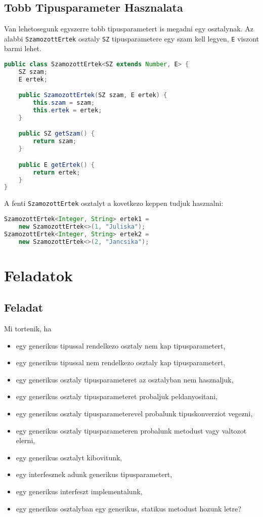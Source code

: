 \documentclass{article}
\let\l\lstinline
\begin{document}
\subsection{Tobb Tipusparameter Hasznalata}

Van lehetosegunk egyszerre tobb tipusparametert is megadni egy osztalynak. Az alabbi \l{SzamozottErtek} osztaly \l{SZ} tipusparametere egy szam kell legyen, \l{E} viszont barmi lehet.

\begin{lstlisting}[language=Java, caption=Osztaly tobb tipusparameterrel]
public class SzamozottErtek<SZ extends Number, E> {
	SZ szam;
	E ertek;

	public SzamozottErtek(SZ szam, E ertek) {
		this.szam = szam;
		this.ertek = ertek;
	}

	public SZ getSzam() {
		return szam;
	}

	public E getErtek() {
		return ertek;
	}
}
\end{lstlisting}
A fenti \l{SzamozottErtek} osztalyt a kovetkezo keppen tudjuk hasznalni:

\begin{lstlisting}[language=Java, caption=SzamozottErtek osztaly hasznalata]
SzamozottErtek<Integer, String> ertek1 =
	new SzamozottErtek<>(1, "Juliska");
SzamozottErtek<Integer, String> ertek2 =
	new SzamozottErtek<>(2, "Jancsika");
\end{lstlisting}

\newpage

\section{Feladatok}

\subsection{Feladat}

Mi tortenik, ha
\begin{itemize}
    \item egy generikus tipussal rendelkezo osztaly nem kap tipusparametert,
    \item egy generikus tipussal nem rendelkezo osztaly kap tipusparametert,
	\item egy generikus osztaly tipusparameteret az osztalyban nem hasznaljuk,
	\item egy generikus osztaly tipusparameteret probaljuk peldanyositani,
	\item egy generikus osztaly tipusparameterevel probalunk tipuskonverziot vegezni,
	\item egy generikus osztaly tipusparameteren probalunk metodust vagy valtozot elerni,
	\item egy generikus osztalyt kibovitunk,
	\item egy interfesznek adunk generikus tipusparametert,
	\item egy generikus interfeszt implementalunk,
	\item egy generikus osztalyban egy generikus, statikus metodust hozunk letre?
\end{itemize}
\end{document}
